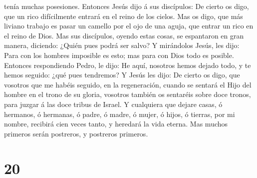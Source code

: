 tenía muchas posesiones.  Entonces Jesús dijo á sus
discípulos: De cierto os digo, que un rico difícilmente entrará en el
reino de los cielos.  Mas os digo, que más liviano trabajo
es pasar un camello por el ojo de una aguja, que entrar un rico en el
reino de Dios.  Mas sus discípulos, oyendo estas cosas, se
espantaron en gran manera, diciendo: ¿Quién pues podrá ser salvo?
 Y mirándolos Jesús, les dijo: Para con los hombres
imposible es esto; mas para con Dios todo es posible. 
Entonces respondiendo Pedro, le dijo: He aquí, nosotros hemos dejado
todo, y te hemos seguido: ¿qué pues tendremos?  Y Jesús les
dijo: De cierto os digo, que vosotros que me habéis seguido, en la
regeneración, cuando se sentará el Hijo del hombre en el trono de su
gloria, vosotros también os sentaréis sobre doce tronos, para juzgar á
las doce tribus de Israel.  Y cualquiera que dejare casas,
ó hermanos, ó hermanas, ó padre, ó madre, ó mujer, ó hijos, ó tierras,
por mi nombre, recibirá cien veces tanto, y heredará la vida eterna.
 Mas muchos primeros serán postreros, y postreros primeros.

\hypertarget{section-19}{%
\section{20}\label{section-19}}

